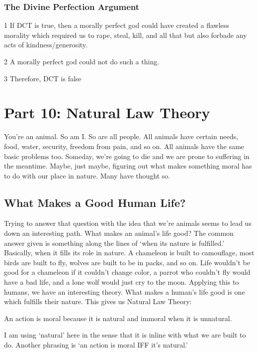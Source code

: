 \subsection{The Divine Perfection Argument}
\begin{earg}
    \item[1] If DCT is true, then a morally perfect god could have created a flawless morality which required us to rape, steal, kill, and all that but also forbade any acts of kindness/generosity.
    \item[2] A morally perfect god could not do such a thing.
    \item[3] Therefore, DCT is false
\end{earg}

\chapter{Part 10: Natural Law Theory}

You’re an animal. So am I. So are all people. All animals have certain needs, food, water, security, freedom from pain, and so on. All animals have the same basic problems too. Someday, we’re going to die and we are prone to suffering in the meantime. Maybe, just maybe, figuring out what makes something moral has to do with our place in nature. Many have thought so.

\section{What Makes a Good Human Life?}

Trying to answer that question with the idea that we’re animals seems to lead us down an interesting path. What makes an animal’s life good? The common answer given is something along the lines of ‘when its nature is fulfilled.’ Basically, when it fills its role in nature. A chameleon is built to camouflage, most birds are built to fly, wolves are built to be in packs, and so on. Life wouldn’t be good for a chameleon if it couldn’t change color, a parrot who couldn’t fly would have a bad life, and a lone wolf would just cry to the moon. Applying this to humans, we have an interesting theory. What makes a human’s life good is one which fulfills their nature. This gives us Natural Law Theory:
\begin{center}
An action is moral because it is natural and immoral when it is unnatural.
\end{center}
I am using ‘natural’ here in the sense that it is inline with what we are built to do. Another phrasing is ‘an action is moral IFF it’s natural.’
